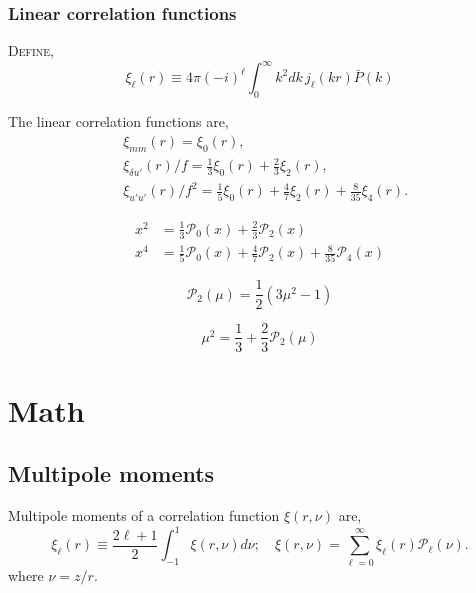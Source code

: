 \documentclass[a4paper,11pt, fleqn]{article}
\begin{document}
\clearpage
\subsubsection{Linear correlation functions}
\textsc{Define},
%
\begin{equation}
  \xi_{\ell}(r)
  \equiv 4\pi (-i)^\ell \int_0^\infty \! k^2 dk \, j_\ell(kr) \bar{P}(k)
\end{equation}


The linear correlation functions are,
\begin{align}
  &\xi_{mm}(r) = \xi_0(r),\\
  &\xi_{\delta u'}(r)/f = \frac{1}{3} \xi_0(r) + \frac{2}{3} \xi_2(r),\\
  &\xi_{u'u'}(r)/f^2 = \frac{1}{5} \xi_0(r) + \frac{4}{7} \xi_2(r)
                      +\frac{8}{35} \xi_4(r).
\end{align}

\begin{align}
  x^2 &= \frac{1}{3} \mathcal{P}_0(x) + \frac{2}{3} \mathcal{P}_2(x)\\
  x^4 &= \frac{1}{5}\mathcal{P}_0(x)
  + \frac{4}{7} \mathcal{P}_2(x)
  + \frac{8}{35} \mathcal{P}_4(x)
\end{align}
  
\clearpage
\begin{equation}
  \mathcal{P}_2(\mu) = \frac{1}{2}\left( 3 \mu^2 - 1 \right)
\end{equation}

\begin{equation}
  \mu^2 = \frac{1}{3} + \frac{2}{3} \mathcal{P}_2(\mu)
\end{equation}


\clearpage
\section{Math}

\subsection{Multipole moments}

Multipole moments of a correlation function $\xi(r,\nu)$ are,
\begin{equation}
  \xi_\ell(r) \equiv \frac{2 \ell + 1}{2} \int_{-1}^1 \xi(r, \nu) d\nu;\quad
  \xi(r, \nu) = \sum_{\ell=0}^\infty \xi_\ell(r) \mathcal{P}_\ell(\nu).
\end{equation}
where $\nu = z/r$.\\
\end{document}
